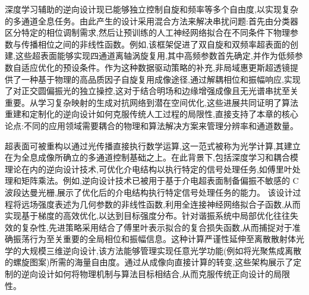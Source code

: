 深度学习辅助的逆向设计现已能够独立控制自旋和频率等多个自由度,以实现复杂的多通道全息任务。由此产生的设计采用混合方法来解决串扰问题:首先由分类器区分特定的相位调制需求,然后让预训练的人工神经网络拟合在不同条件下物理参数与传播相位之间的非线性函数。例如,该框架促进了双自旋和双频率超表面的创建,这些超表面能够实现四通道离轴涡旋复用,其中高频参数首先确定,并作为低频参数自适应优化的预设条件。作为这种数据驱动策略的补充,非局域惠更斯超透镜提供了一种基于物理的高品质因子自旋复用成像途径,通过解耦相位和振幅响应,实现了对正交圆偏振光的独立操控,这对于结合明场和边缘增强成像且无光谱串扰至关重要。从学习复杂映射的生成对抗网络到潜在空间优化,这些进展共同证明了算法重建和定制化的逆向设计如何克服传统人工过程的局限性,直接支持了本章的核心论点:不同的应用领域需要耦合的物理和算法解决方案来管理分辨率和通道数量。\citep{doi_10_1117_1_apn_2_1_016010_57069347} \citep{doi_10_1038_s41377_024_01728_3_7dbdfab0} \citep{doi_10_3390_photonics12100947_b44bdefd}

超表面可被重构以通过光传播直接执行数学运算,这一范式被称为光学计算,其建立在为全息成像所确立的多通道控制基础之上。在此背景下,包括深度学习和耦合模理论在内的逆向设计技术,可优化介电结构以执行特定的信号处理任务,如傅里叶处理和矩阵乘法。例如,逆向设计技术已被用于基于介电超表面制备偏振不敏感的 C 波段达曼光栅,展示了优化后的介电结构执行特定信号处理任务的能力。\citep{doi_10_1016_j_rinp_2023_106238_0ebde0ff} 该设计过程将远场强度表述为几何参数的非线性函数,利用全连接神经网络拟合子函数,从而实现基于梯度的高效优化,以达到目标强度分布。针对谐振系统中局部优化往往失效的复杂性,先进策略采用结合了傅里叶表示拟合的复合损失函数,从而捕捉对于准确振荡行为至关重要的全局相位和振幅信息。这种计算严谨性延伸至离散散射体光学的大规模三维逆向设计,该方法能够管理实现任意光学功能(例如将光聚焦成离散的螺旋图案)所需的海量自由度。通过从成像向直接计算的转变,这些架构展示了定制的逆向设计如何将物理机制与算法目标相结合,从而克服传统正向设计的局限性。\citep{doi_10_1021_acsphotonics_4c00171_f68cb79c} \citep{doi_10_1515_nanoph_2020_0379_1cc596ab} \citep{doi_10_1117_12_2511323_41684364}

